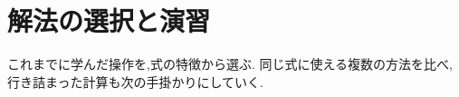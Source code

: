 
\chapter{解法の選択と演習}\label{章：実際の解き方}
\begin{bookcolumns}

  これまでに学んだ操作を,式の特徴から選ぶ.
  同じ式に使える複数の方法を比べ,行き詰まった計算も次の手掛かりにしていく.






\end{bookcolumns}
